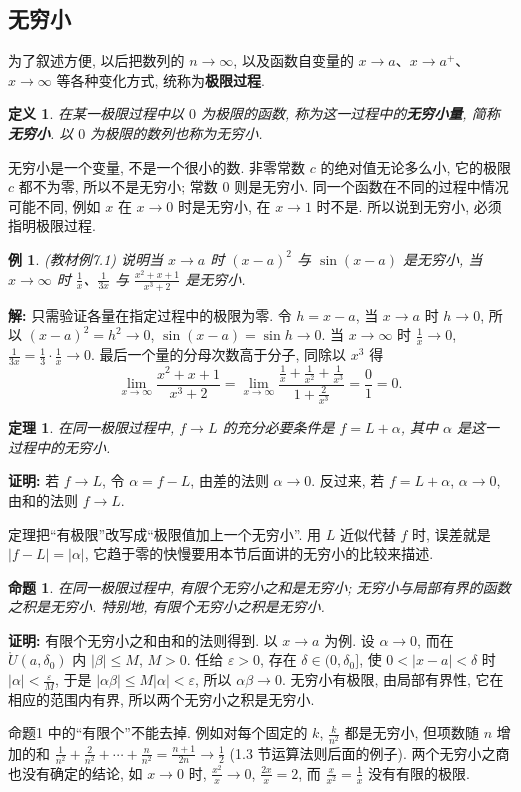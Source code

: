 \documentclass[UTF8,openany]{ctexbook}
\theoremstyle{chinesetextbook}
\newtheorem{definition}{定义}[section]
\newtheorem{example}{例}[section]
\newtheorem{proposition}{命题}[section]
\newenvironment{cnproof}{\par\indent\textbf{证明:} \ignorespaces}{\par}
\newenvironment{cnsolution}{\par\indent\textbf{解:} \ignorespaces}{\par}
\newtheorem*{theoremsingle}{定理}
\begin{document}
\subsection{无穷小}
为了叙述方便, 以后把数列的 $n\to\infty$, 以及函数自变量的 $x\to a$、$x\to a^+$、$x\to\infty$ 等各种变化方式, 统称为\textbf{极限过程}.
\begin{definition}
在某一极限过程中以 $0$ 为极限的函数, 称为这一过程中的\textbf{无穷小量}, 简称\textbf{无穷小}. 以 $0$ 为极限的数列也称为无穷小.
\end{definition}
无穷小是一个变量, 不是一个很小的数. 非零常数 $c$ 的绝对值无论多么小, 它的极限 $c$ 都不为零, 所以不是无穷小; 常数 $0$ 则是无穷小. 同一个函数在不同的过程中情况可能不同, 例如 $x$ 在 $x\to0$ 时是无穷小, 在 $x\to1$ 时不是. 所以说到无穷小, 必须指明极限过程.
\begin{example}
\textnormal{(教材例7.1)} 说明当 $x\to a$ 时 $(x-a)^2$ 与 $\sin(x-a)$ 是无穷小, 当 $x\to\infty$ 时 $\displaystyle\frac1x$、$\displaystyle\frac1{3x}$ 与 $\displaystyle\frac{x^2+x+1}{x^3+2}$ 是无穷小.
\end{example}
\begin{cnsolution}
只需验证各量在指定过程中的极限为零. 令 $h=x-a$, 当 $x\to a$ 时 $h\to0$, 所以 $(x-a)^2=h^2\to0$, $\sin(x-a)=\sin h\to0$. 当 $x\to\infty$ 时 $\displaystyle\frac1x\to0$, $\displaystyle\frac1{3x}=\frac13\cdot\frac1x\to0$. 最后一个量的分母次数高于分子, 同除以 $x^3$ 得
\[
\lim_{x\to\infty}\frac{x^2+x+1}{x^3+2}=\lim_{x\to\infty}\frac{\frac1x+\frac1{x^2}+\frac1{x^3}}{1+\frac2{x^3}}=\frac01=0.
\]
\end{cnsolution}
\begin{theoremsingle}
在同一极限过程中, $f\to L$ 的充分必要条件是 $f=L+\alpha$, 其中 $\alpha$ 是这一过程中的无穷小.
\end{theoremsingle}
\begin{cnproof}
若 $f\to L$, 令 $\alpha=f-L$, 由差的法则 $\alpha\to0$. 反过来, 若 $f=L+\alpha$, $\alpha\to0$, 由和的法则 $f\to L$.
\end{cnproof}
定理把“有极限”改写成“极限值加上一个无穷小”. 用 $L$ 近似代替 $f$ 时, 误差就是 $|f-L|=|\alpha|$, 它趋于零的快慢要用本节后面讲的无穷小的比较来描述.
\begin{proposition}
在同一极限过程中, 有限个无穷小之和是无穷小; 无穷小与局部有界的函数之积是无穷小. 特别地, 有限个无穷小之积是无穷小.
\end{proposition}
\begin{cnproof}
有限个无穷小之和由和的法则得到. 以 $x\to a$ 为例. 设 $\alpha\to0$, 而在 $\mathring U(a,\delta_0)$ 内 $|\beta|\le M$, $M>0$. 任给 $\varepsilon>0$, 存在 $\delta\in(0,\delta_0]$, 使 $0<|x-a|<\delta$ 时 $\displaystyle|\alpha|<\frac\varepsilon M$, 于是 $|\alpha\beta|\le M|\alpha|<\varepsilon$, 所以 $\alpha\beta\to0$. 无穷小有极限, 由局部有界性, 它在相应的范围内有界, 所以两个无穷小之积是无穷小.
\end{cnproof}
命题1 中的“有限个”不能去掉. 例如对每个固定的 $k$, $\displaystyle\frac k{n^2}$ 都是无穷小, 但项数随 $n$ 增加的和 $\displaystyle\frac1{n^2}+\frac2{n^2}+\cdots+\frac n{n^2}=\frac{n+1}{2n}\to\frac12$ (1.3 节运算法则后面的例子). 两个无穷小之商也没有确定的结论, 如 $x\to0$ 时, $\displaystyle\frac{x^2}x\to0$, $\displaystyle\frac{2x}x=2$, 而 $\displaystyle\frac x{x^2}=\frac1x$ 没有有限的极限.
\end{document}
